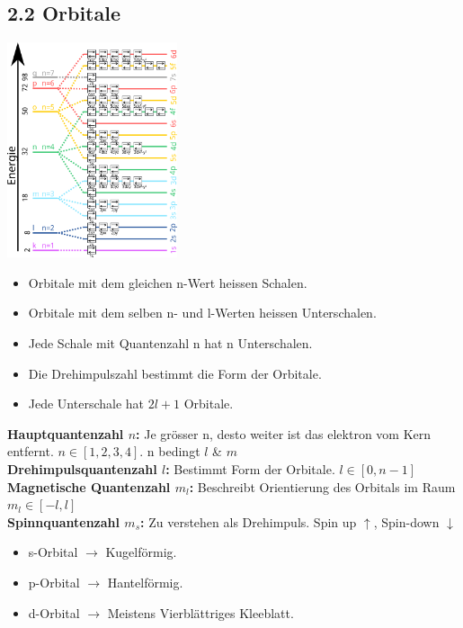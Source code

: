 \begin{multicols*}{4}
\subsection{2.2 Orbitale}{
    \includegraphics[width = 5cm, angle=-90]{Bilder/Energieniveau.png}
    \begin{itemize}[noitemsep, leftmargin=*]
        \item Orbitale mit dem gleichen n-Wert heissen Schalen. 
        \item Orbitale mit dem selben n- und l-Werten heissen Unterschalen.
        \item Jede Schale mit Quantenzahl n hat n Unterschalen.
        \item Die Drehimpulszahl bestimmt die Form der Orbitale.
        \item Jede Unterschale hat $2l + 1$ Orbitale.
    \end{itemize}
    \textbf{Hauptquantenzahl $n$:} Je grösser n, desto weiter ist das elektron vom Kern entfernt. $n \in [1, 2, 3, 4]$. n bedingt $l$ \& $m$
    \vspace{1mm}\\
    \textbf{Drehimpulsquantenzahl $l$:} Bestimmt Form der Orbitale. $l \in [0, n-1]$
    \vspace{1mm}\\
    \textbf{Magnetische Quantenzahl $m_l$:} Beschreibt  Orientierung des Orbitals im Raum $m_l \in [-l, l]$
    \vspace{1mm}\\
    \textbf{Spinnquantenzahl $m_s$:} Zu verstehen als Drehimpuls. Spin up $\uparrow$, Spin-down $\downarrow$ 
    \begin{itemize}[noitemsep, leftmargin=*]
        \item s-Orbital $\rightarrow$ Kugelförmig.
        \item p-Orbital $\rightarrow$ Hantelförmig.
        \item d-Orbital $\rightarrow$ Meistens Vierblättriges Kleeblatt.

\end{itemize}}
\end{multicols*}
